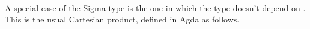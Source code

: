 \ccpad
\begin{code}%
\>[1]\AgdaSpace{}%
\AgdaSymbol{:}\AgdaSpace{}%
\AgdaSymbol{\{}\AgdaSpace{}%
\AgdaSpace{}%
\AgdaSymbol{:}\AgdaSpace{}%
\AgdaSymbol{\}}\AgdaSpace{}%
\AgdaSymbol{(}\AgdaSpace{}%
\AgdaSymbol{:}\AgdaSpace{}%
\AgdaSpace{}%
\AgdaSpace{}%
\AgdaSymbol{)}\AgdaSpace{}%
\AgdaSymbol{(}\AgdaSpace{}%
\AgdaSymbol{:}\AgdaSpace{}%
\AgdaSpace{}%
\AgdaSpace{}%
\AgdaSpace{}%
\AgdaSpace{}%
\AgdaSymbol{)}\AgdaSpace{}%
\AgdaSpace{}%
\AgdaSpace{}%
\AgdaSpace{}%
\AgdaSpace{}%
\<%
\\
%
\>[1]\AgdaSpace{}%
\AgdaSpace{}%
\AgdaSpace{}%
\AgdaSymbol{=}\AgdaSpace{}%
\AgdaSpace{}%
\<%
\\
%
\\[\AgdaEmptyExtraSkip]%
%
\>[1]\AgdaSpace{}%
\AgdaSpace{}%
\AgdaSpace{}%
\AgdaSpace{}%
\AgdaSpace{}%
\AgdaSpace{}%
\AgdaSymbol{)}\AgdaSpace{}%
\AgdaSymbol{=}\AgdaSpace{}%
\AgdaSpace{}%
\AgdaSpace{}%
\AgdaSpace{}%
\AgdaSpace{}%
\AgdaFunction{,}\AgdaSpace{}%
\<%
\end{code}
\scpad

A special case of the Sigma type is the one in which the type  doesn't depend on . This is the usual Cartesian product, defined in Agda as follows.
\ccpad
\begin{code}%
\>[1]\AgdaSpace{}%
\AgdaSymbol{:}\AgdaSpace{}%
\AgdaSpace{}%
\AgdaSpace{}%
\AgdaSpace{}%
\AgdaSpace{}%
\AgdaSpace{}%
\AgdaSpace{}%
\AgdaSpace{}%
\AgdaSpace{}%
\AgdaSpace{}%
\<%
\\
%
\>[1]\AgdaSpace{}%
\AgdaSpace{}%
\AgdaSpace{}%
\AgdaSymbol{=}\AgdaSpace{}%
\AgdaSpace{}%
\AgdaSpace{}%
\AgdaSpace{}%
\AgdaSpace{}%
\AgdaFunction{,}\AgdaSpace{}%
\<%
\end{code}





